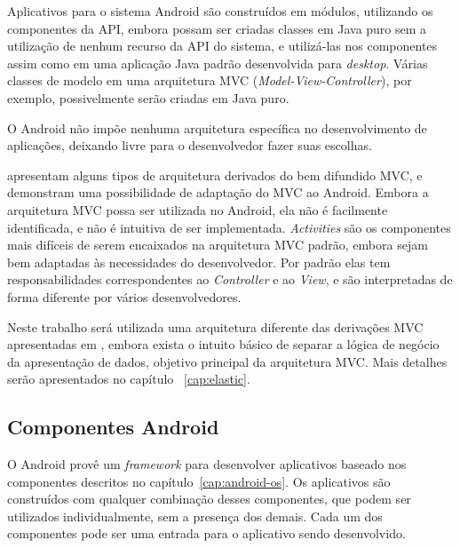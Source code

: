 Aplicativos para o sistema Android são construídos em módulos, utilizando os componentes da API, embora possam ser criadas classes em Java puro sem a utilização de nenhum recurso da API do sistema, e utilizá-las nos componentes assim como em uma aplicação Java padrão desenvolvida para \textit{desktop}. Várias classes de modelo em uma arquitetura MVC (\textit{Model-View-Controller}), por exemplo, possivelmente serão criadas em Java puro.

O Android não impõe nenhuma arquitetura específica no desenvolvimento de aplicações, deixando livre para o desenvolvedor fazer suas escolhas.

 apresentam alguns tipos de arquitetura derivados do bem difundido MVC, e demonstram uma possibilidade de adaptação do MVC ao Android. Embora a arquitetura MVC possa ser utilizada no Android, ela não é facilmente identificada, e não é intuitiva de ser implementada. \textit{Activities} são os componentes mais difíceis de serem encaixados na arquitetura MVC padrão, embora sejam bem adaptadas às necessidades do desenvolvedor. Por padrão elas tem responsabilidades correspondentes ao \textit{Controller} e ao \textit{View}, e são interpretadas de forma diferente por vários desenvolvedores.

Neste trabalho será utilizada uma arquitetura diferente das derivações MVC apresentadas em , embora exista o intuito básico de separar a lógica de negócio da apresentação de dados, objetivo principal da arquitetura MVC. Mais detalhes serão apresentados no capítulo ~\ref{cap:elastic}.

\subsection{Componentes Android}

O Android provê um \textit{framework} para desenvolver aplicativos baseado nos componentes descritos no capítulo~\ref{cap:android-os}. Os aplicativos são construídos com qualquer combinação desses componentes, que podem ser utilizados individualmente, sem a presença dos demais. Cada um dos componentes pode ser uma entrada para o aplicativo sendo desenvolvido.

